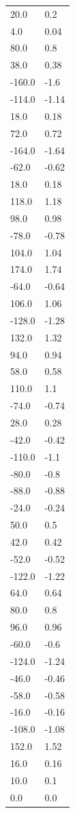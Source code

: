 \begin{longtable}{ll}
20.0 & 0.2 \\
4.0 & 0.04 \\
80.0 & 0.8 \\
38.0 & 0.38 \\
-160.0 & -1.6 \\
-114.0 & -1.14 \\
18.0 & 0.18 \\
72.0 & 0.72 \\
-164.0 & -1.64 \\
-62.0 & -0.62 \\
18.0 & 0.18 \\
118.0 & 1.18 \\
98.0 & 0.98 \\
-78.0 & -0.78 \\
104.0 & 1.04 \\
174.0 & 1.74 \\
-64.0 & -0.64 \\
106.0 & 1.06 \\
-128.0 & -1.28 \\
132.0 & 1.32 \\
94.0 & 0.94 \\
58.0 & 0.58 \\
110.0 & 1.1 \\
-74.0 & -0.74 \\
28.0 & 0.28 \\
-42.0 & -0.42 \\
-110.0 & -1.1 \\
-80.0 & -0.8 \\
-88.0 & -0.88 \\
-24.0 & -0.24 \\
50.0 & 0.5 \\
42.0 & 0.42 \\
-52.0 & -0.52 \\
-122.0 & -1.22 \\
64.0 & 0.64 \\
80.0 & 0.8 \\
96.0 & 0.96 \\
-60.0 & -0.6 \\
-124.0 & -1.24 \\
-46.0 & -0.46 \\
-58.0 & -0.58 \\
-16.0 & -0.16 \\
-108.0 & -1.08 \\
152.0 & 1.52 \\
16.0 & 0.16 \\
10.0 & 0.1 \\
0.0 & 0.0 \\

\end{longtable}
